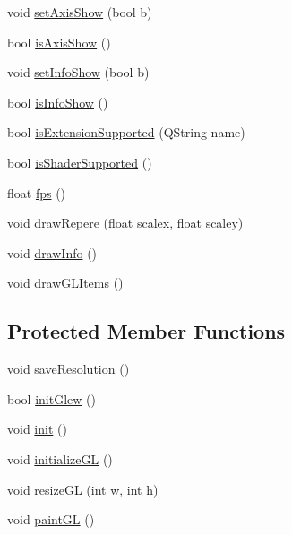 \begin{CompactItemize}
\item 
void \hyperlink{class_k_g_l_view_f8263dcf540805c60d724c50e539075f}{setAxisShow} (bool b)
\item 
bool \hyperlink{class_k_g_l_view_865bf8ed1692292d820f13b2321e799d}{isAxisShow} ()
\item 
void \hyperlink{class_k_g_l_view_f9d4eb0a56f1554b348e346cd2342af3}{setInfoShow} (bool b)
\item 
bool \hyperlink{class_k_g_l_view_369ac3eaa08535c8b333d6b8c3793ea1}{isInfoShow} ()
\item 
bool \hyperlink{class_k_g_l_view_c2cc43b86ba6526450d7e9fa3403a484}{isExtensionSupported} (QString name)
\item 
bool \hyperlink{class_k_g_l_view_c1f4d61a7d289074b048ff5791bb3eb5}{isShaderSupported} ()
\item 
float \hyperlink{class_k_g_l_view_ced2f61bddfddf00dba43091176b60ec}{fps} ()
\item 
void \hyperlink{class_k_g_l_view_90318195b5d7d7b03b8d0f21e1993495}{drawRepere} (float scalex, float scaley)
\item 
void \hyperlink{class_k_g_l_view_ed5b1c5deb70a6fe75698d6bf13de0d5}{drawInfo} ()
\item 
void \hyperlink{class_k_g_l_view_f51f913a1902dbc506e4a070cb3e3058}{drawGLItems} ()
\end{CompactItemize}
\subsection*{Protected Member Functions}
\begin{CompactItemize}
\item 
void \hyperlink{class_k_g_l_view_0f69b4842403e72541e2486ea8d289dd}{saveResolution} ()
\item 
bool \hyperlink{class_k_g_l_view_da553856497a8a6b062c1cdf73a3748e}{initGlew} ()
\item 
void \hyperlink{class_k_g_l_view_50930df9b82dba12bc784823a4b9f1f9}{init} ()
\item 
void \hyperlink{class_k_g_l_view_02a6477b2bd3345fea3a2e55e181475a}{initializeGL} ()
\item 
void \hyperlink{class_k_g_l_view_1599a4d77e626cc204f565031ae5bf81}{resizeGL} (int w, int h)
\item 
void \hyperlink{class_k_g_l_view_46018bb23711a3ae7ce5dc37b46302bb}{paintGL} ()
\end{CompactItemize}


